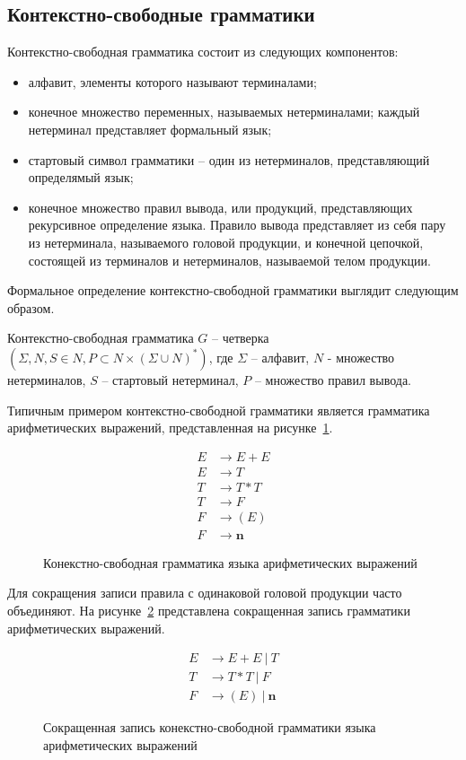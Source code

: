 \subsection{Контекстно-свободные грамматики}
Контекстно-свободная грамматика состоит из следующих компонентов:
\begin{itemize}
    \item алфавит, элементы которого называют терминалами;
    \item конечное множество переменных, называемых нетерминалами; каждый нетерминал представляет формальный язык;
    \item стартовый символ грамматики -- один из нетерминалов, представляющий определямый язык;
    \item конечное множество правил вывода, или продукций, представляющих рекурсивное определение языка.
    Правило вывода представляет из себя пару из нетерминала, называемого головой продукции, и конечной цепочкой,
    состоящей из терминалов и нетерминалов, называемой телом продукции.
\end{itemize}
Формальное определение контекстно-свободной грамматики выглядит следующим образом.
\begin{definition}
Контекстно-свободная грамматика $G$ -- четверка $(\Sigma, N, S \in N, P \subset N \times (\Sigma \cup N)^*)$,
где $\Sigma$ -- алфавит, $N$ - множество нетерминалов, $S$ -- стартовый нетерминал, $P$ -- множество правил вывода.
\end{definition}
Типичным примером контекстно-свободной грамматики является грамматика арифметических выражений, представленная на рисунке~\ref{cf-expr}.
\begin{figure}
    \begin{align*}
        E &\rightarrow E + E\\
        E &\rightarrow T\\
        T &\rightarrow T * T\\
        T &\rightarrow F\\
        F &\rightarrow (E)\\
        F &\rightarrow \pmb{n}
    \end{align*}
    \caption{Конекстно-свободная грамматика языка арифметических выражений}
    \label{cf-expr}
\end{figure}

Для сокращения записи правила с одинаковой головой продукции часто объединяют. На рисунке~\ref{cf-expr-short} представлена сокращенная запись грамматики арифметических выражений.
\begin{figure}
    \begin{align*}
        E &\rightarrow E + E\ |\ T\\
        T &\rightarrow T * T\ |\ F\\
        F &\rightarrow (E)\ |\ \pmb{n}
    \end{align*}
    \caption{Сокращенная запись конекстно-свободной грамматики языка арифметических выражений}
    \label{cf-expr-short}
\end{figure}
\FloatBarrier
